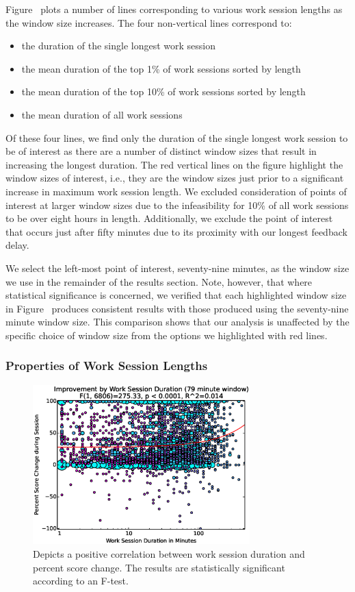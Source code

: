 Figure~ plots a number of lines corresponding to
various work session lengths as the window size increases. The four
non-vertical lines correspond to:

\begin{itemize}
\item the duration of the single longest work session
\item the mean duration of the top 1\% of work sessions sorted by length
\item the mean duration of the top 10\% of work sessions sorted by length
\item the mean duration of all work sessions
\end{itemize}

Of these four lines, we find only the duration of the single longest work
session to be of interest as there are a number of distinct window sizes that
result in increasing the longest duration. The red vertical lines on the figure
highlight the window sizes of interest, i.e., they are the window sizes just
prior to a significant increase in maximum work session length. We excluded
consideration of points of interest at larger window sizes due to the
infeasibility for 10\% of all work sessions to be over eight hours in
length. Additionally, we exclude the point of interest that occurs just after
fifty minutes due to its proximity with our longest feedback delay.

We select the left-most point of interest, seventy-nine minutes, as the window
size we use in the remainder of the results section. Note, however, that where
statistical significance is concerned, we verified that each highlighted window
size in Figure~ produces consistent results with
those produced using the seventy-nine minute window size. This comparison shows
that our analysis is unaffected by the specific choice of window size from the
options we highlighted with red lines.

\subsubsection{Properties of Work Session Lengths}

\begin{figure}[!t]
\centering \includegraphics[width=3.3in]{graphs/Improvement_by_Work_Session_Duration_(79_minute_window).eps}
\caption{Depicts a positive correlation between work session duration and
  percent score change. The results are statistically significant according to
  an F-test.}
\end{figure}

